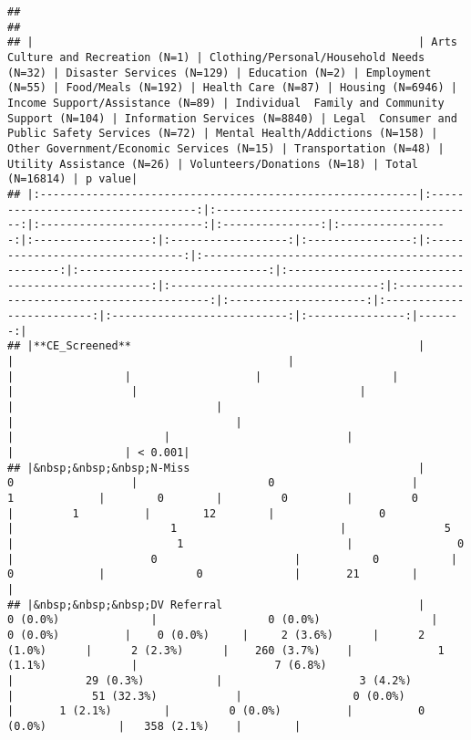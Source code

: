 \documentclass[
]{article}
\begin{document}
\begin{verbatim}
## 
## 
## |                                                           | Arts  Culture and Recreation (N=1) | Clothing/Personal/Household Needs (N=32) | Disaster Services (N=129) | Education (N=2) | Employment (N=55) | Food/Meals (N=192) | Health Care (N=87) | Housing (N=6946) | Income Support/Assistance (N=89) | Individual  Family and Community Support (N=104) | Information Services (N=8840) | Legal  Consumer and Public Safety Services (N=72) | Mental Health/Addictions (N=158) | Other Government/Economic Services (N=15) | Transportation (N=48) | Utility Assistance (N=26) | Volunteers/Donations (N=18) | Total (N=16814) | p value|
## |:----------------------------------------------------------|:----------------------------------:|:----------------------------------------:|:-------------------------:|:---------------:|:-----------------:|:------------------:|:------------------:|:----------------:|:--------------------------------:|:------------------------------------------------:|:-----------------------------:|:-------------------------------------------------:|:--------------------------------:|:-----------------------------------------:|:---------------------:|:-------------------------:|:---------------------------:|:---------------:|-------:|
## |**CE_Screened**                                            |                                    |                                          |                           |                 |                   |                    |                    |                  |                                  |                                                  |                               |                                                   |                                  |                                           |                       |                           |                             |                 | < 0.001|
## |&nbsp;&nbsp;&nbsp;N-Miss                                   |                 0                  |                    0                     |             1             |        0        |         0         |         0          |         1          |        12        |                0                 |                        1                         |               5               |                         1                         |                0                 |                     0                     |           0           |             0             |              0              |       21        |        |
## |&nbsp;&nbsp;&nbsp;DV Referral                              |              0 (0.0%)              |                 0 (0.0%)                 |         0 (0.0%)          |    0 (0.0%)     |     2 (3.6%)      |      2 (1.0%)      |      2 (2.3%)      |    260 (3.7%)    |             1 (1.1%)             |                     7 (6.8%)                     |           29 (0.3%)           |                     3 (4.2%)                      |            51 (32.3%)            |                 0 (0.0%)                  |       1 (2.1%)        |         0 (0.0%)          |          0 (0.0%)           |   358 (2.1%)    |        |

\end{verbatim}
\end{document}
